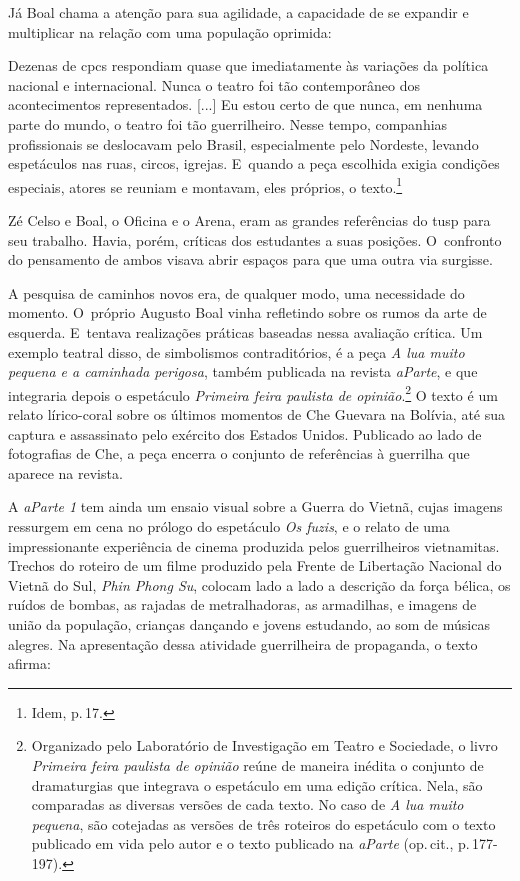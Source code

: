 {Já Boal chama a atenção para sua agilidade, a capacidade de se expandir e multiplicar na
relação com uma população oprimida:

\startblockquote
Dezenas de {\sc cpc}s respondiam quase que imediatamente às variações da
política nacional e internacional. Nunca o teatro foi tão contemporâneo
dos acontecimentos representados. {[}...{]} Eu estou certo de que nunca,
em nenhuma parte do mundo, o teatro foi tão guerrilheiro. Nesse tempo,
companhias profissionais se deslocavam pelo Brasil, especialmente pelo
Nordeste, levando espetáculos nas ruas, circos, igrejas. E~quando a peça
escolhida exigia condições especiais, atores se reuniam e montavam, eles
próprios, o texto.\footnote{Idem, p.\,17.}
\stopblockquote

Zé Celso e Boal, o Oficina e o Arena, eram as grandes referências do
{\sc tusp} para seu trabalho. Havia, porém, críticas dos estudantes a suas
posições. O~confronto do pensamento de ambos visava abrir espaços para
que uma outra via surgisse.

A pesquisa de caminhos novos era, de qualquer modo, uma necessidade do
momento. O~próprio Augusto Boal vinha refletindo sobre os rumos da arte
de esquerda. E~tentava realizações práticas baseadas nessa avaliação
crítica. Um exemplo teatral disso, de simbolismos contraditórios, é a
peça {\it A lua muito pequena e a caminhada perigosa}, também publicada
na revista {\it aParte}, e que integraria depois o espetáculo
{\it Primeira feira paulista de opinião}.\footnote{Organizado
  pelo Laboratório de Investigação em Teatro e Sociedade, o livro {\it Primeira feira paulista de opinião} reúne de maneira inédita o conjunto de dramaturgias que integrava o espetáculo em
  uma edição crítica. Nela, são comparadas as diversas versões de cada
  texto. No caso de {\it A lua muito pequena}, são cotejadas as versões
  de três roteiros do espetáculo com o texto publicado em vida pelo
  autor e o texto publicado na {\it aParte} (op.\,cit., p.\,177-197).} O texto é um relato lírico-coral sobre os
últimos momentos de Che Guevara na Bolívia, até sua captura e
assassinato pelo exército dos Estados Unidos. Publicado ao lado de
fotografias de Che, a peça encerra o conjunto de referências à guerrilha
que aparece na revista.

A {\it aParte 1} tem ainda um ensaio visual sobre a Guerra do Vietnã,
cujas imagens ressurgem em cena no prólogo do espetáculo {\it Os fuzis},
e o relato de uma impressionante experiência de cinema produzida pelos
guerrilheiros vietnamitas. Trechos do roteiro de um filme produzido pela
Frente de Libertação Nacional do Vietnã do Sul, {\it Phin Phong Su},
colocam lado a lado a descrição da força bélica, os ruídos de bombas, as
rajadas de metralhadoras, as armadilhas, e imagens de união da
população, crianças dançando e jovens estudando, ao som de músicas
alegres. Na apresentação dessa atividade guerrilheira de propaganda, o
texto afirma:

}
